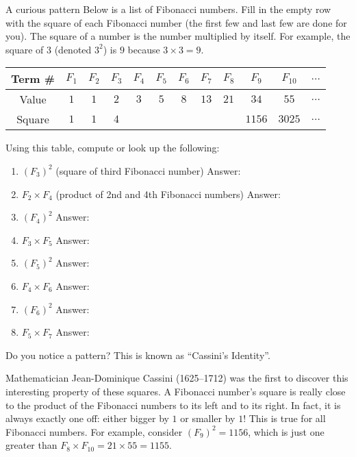 \documentclass[12pt,letterpaper]{article}
\makeatletter
\newenvironment{problem}{\@startsection
       {section}
       {1}
       {-.2em}
       {-3.5ex plus -1ex minus -.2ex}
       {2.3ex plus .2ex}
       {\pagebreak[3]
       \large\bf\noindent{Problem }
       }
       }
\makeatother
\begin{document}
\begin{problem}{A curious pattern}
 Below is a list of Fibonacci numbers. Fill in the empty row with the square of each Fibonacci
 number (the first few and last few are done for you). The square of a number is the number multiplied
 by itself. For example, the square of $3$ (denoted $3^2$) is $9$ because $3 \times 3=9$.
 
 \begin{center}
 \begin{tabular}{|c|c|c|c|c|c|c|c|c|c|c|c|}
 \hline
  Term \# & $F_1$ & $F_2$ & $F_3$ & $F_4$ & $F_5$ & $F_6$ & $F_7$ & $F_8$ & $F_9$ & $F_{10}$ & $\ldots$ \\ \hline
  Value & $1$ & $1$ & $2$ & $3$ & $5$ & $8$ & $13$ & $21$ & $34$ & $55$ & $\ldots$ \\ \hline
  Square & $1$ & $1$ & $4$ & & & & & & $1156$ & $3025$ & $\ldots$ \\ \hline
 \end{tabular}
 \end{center}
 
 Using this table, compute or look up the following:
 
 \begin{enumerate}
  \item $\left(F_3\right)^2$ (square of third Fibonacci number) \hfill Answer: \underline{\hspace{4em}}
  \item $F_2 \times F_4$ (product of 2nd and 4th Fibonacci numbers) \hfill Answer: \underline{\hspace{4em}}
  \item $\left(F_4\right)^2$ \hfill Answer: \underline{\hspace{4em}}
  \item $F_3 \times F_5$ \hfill Answer: \underline{\hspace{4em}}
  \item $\left(F_5\right)^2$ \hfill Answer: \underline{\hspace{4em}}
  \item $F_4 \times F_6$ \hfill Answer: \underline{\hspace{4em}}
  \item $\left(F_6\right)^2$ \hfill Answer: \underline{\hspace{4em}}
  \item $F_5 \times F_7$ \hfill Answer: \underline{\hspace{4em}}
 \end{enumerate}
 
 Do you notice a pattern? This is known as ``Cassini's Identity''.

 Mathematician Jean-Dominique Cassini (1625--1712) was the first to discover this interesting property of these squares.
 A Fibonacci number's square is really close to the product of the Fibonacci numbers to its left and to its right.
 In fact, it is always exactly one off: either bigger by $1$ or smaller by $1$!
 This is true for all Fibonacci numbers. For example, consider
 $\left(F_9\right)^2=1156$, which is just one greater than $F_8 \times F_{10} = 21 \times 55 = 1155$.
\end{problem}
\end{document}
